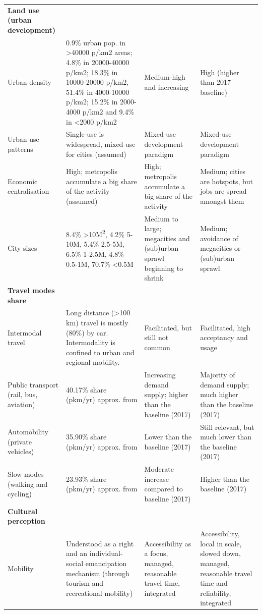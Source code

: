 \begin{longtable}{p{2.5cm}p{4.5cm}p{4cm}p{4cm}}
\textbf{Land use (urban development)} &  &  &  \\*
Urban density & 0.9\% urban pop. in \textgreater40000 p/km2 areas; 4.8\% in 20000-40000 p/km2; 18.3\% in 10000-20000 p/km2, 51.4\% in 4000-10000 p/km2; 15.2\% in 2000-4000 p/km2 and 9.4\% in \textless2000 p/km2 \parencite{cox2017_DemographiaWorldUrban} & Medium-high and increasing & High (higher than 2017 baseline) \\*
Urban use patterns & Single-use is widespread, mixed-use for cities (assumed) & Mixed-use development paradigm & Mixed-use development paradigm \\*
Economic centralisation & High; metropolis accumulate a big share of the activity (assumed) & High; metropolis accumulate a big share of the activity & Medium; cities are hotspots, but jobs are spread amongst them \\*
City sizes & 8.4\% \textgreater10M\textsuperscript{2}, 4.2\% 5-10M, 5.4\% 2.5-5M, 6.5\% 1-2.5M, 4.8\% 0.5-1M, 70.7\% \textless0.5M \parencite{cox2017_DemographiaWorldUrban} & Medium to large; megacities and (sub)urban sprawl beginning to shrink & Medium; avoidance of megacities or (sub)urban sprawl \\\addlinespace
\textbf{Travel modes share} &  &  &  \\*
Intermodal travel & Long distance (\textgreater100 km) travel is mostly (80\%) by car. Intermodality is confined to urban and regional mobility. \parencite{riley2010_IntermodalPassengerTransport} & Facilitated, but still not common & Facilitated, high acceptancy and usage \\*
Public transport (rail, bus, aviation) & 40.17\% share (pkm/yr) approx. from \parencite{vuuren2017_Energylanduse} & Increasing demand supply; higher than the baseline (2017) & Majority of demand supply; much higher than the baseline (2017) \\*
Automobility (private vehicles) & 35.90\% share (pkm/yr) approx. from \parencite{vuuren2017_Energylanduse} & Lower than the baseline (2017) & Still relevant, but much lower than the baseline (2017) \\*
Slow modes (walking and cycling) & 23.93\% share (pkm/yr) approx. from \parencite{vuuren2017_Energylanduse} & Moderate increase compared to baseline (2017) & Higher than the baseline (2017) \\\addlinespace
\textbf{Cultural perception} &  &  &  \\*
Mobility & Understood as a right and an individual-social emancipation mechanism (through tourism and recreational mobility) \parencite{sheller2008_MobilityFreedomPublic} & Accessibility as a focus, managed, reasonable travel time, integrated & Accessibility, local in scale, slowed down, managed, reasonable travel time and reliability, integrated \\*

\end{longtable}
